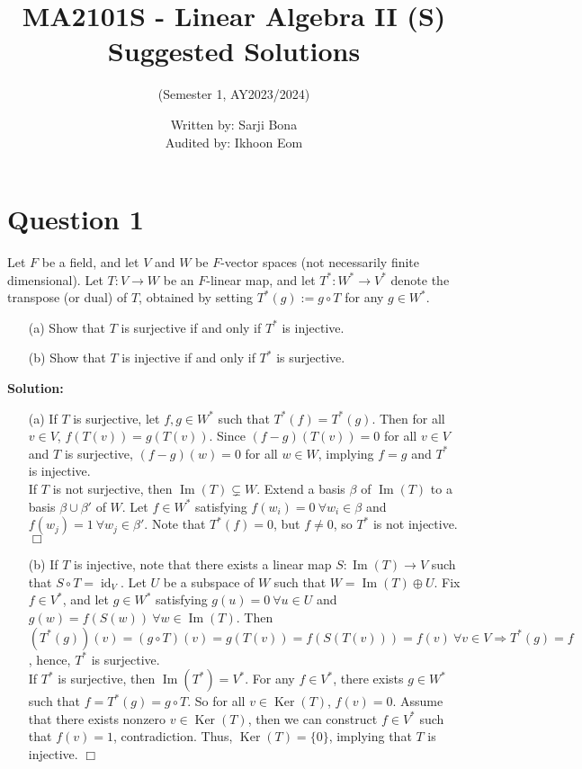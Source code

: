 \documentclass[12pt]{article}
\title{MA2101S - Linear Algebra II (S) Suggested Solutions}
\author{(Semester 1, AY2023/2024)}
\date{Written by: Sarji Bona\\Audited by: Ikhoon Eom}
\DeclareMathOperator{\id}{id}
\DeclareMathOperator{\im}{Im}
\DeclareMathOperator{\Ker}{Ker}
\begin{document}
\maketitle

\section*{Question 1}
Let $F$ be a field, and let $V$ and $W$ be $F$-vector spaces (not necessarily finite dimensional). Let $T : V \to W$ be an $F$-linear map, and let $T^* : W^* \to V^*$ denote the transpose (or dual) of $T$, obtained by setting $T^*(g) := g \circ T$ for any $g \in W^*$. 
\begin{enumerate}
    \item[(a)] Show that $T$ is surjective if and only if $T^*$ is injective.
    \item[(b)] Show that $T$ is injective if and only if $T^*$ is surjective.
\end{enumerate}
\textbf{Solution:} 
\begin{enumerate}
    \item[(a)] If $T$ is surjective, let $f, g \in W^*$ such that $T^*(f) = T^*(g)$. Then for all $v \in V$, $f(T(v)) = g(T(v))$. Since $(f - g)(T(v)) = 0$ for all $v \in V$ and $T$ is surjective, $(f - g)(w) = 0$ for all $w \in W$, implying $f = g$ and $T^*$ is injective. \\

    If $T$ is not surjective, then $\im(T) \subsetneq W$. Extend a basis $\beta$ of $\im(T)$ to a basis $\beta \cup \beta'$ of $W$. Let $f \in W^*$ satisfying $f(w_i) = 0 \ \forall w_i \in \beta$ and $f(w_j) = 1 \ \forall w_j \in \beta'$. Note that $T^*(f) = 0$, but $f \ne 0$, so $T^*$ is not injective. \hfill  $\Box$
    \item[(b)] If $T$ is injective, note that there exists a linear map $S : \im(T) \to V$ such that $S \circ T = \id_V$. Let $U$ be a subspace of $W$ such that $W = \im(T) \oplus U$. Fix $f \in V^*$, and let $g \in W^*$ satisfying $g(u) = 0 \ \forall u \in U$ and $g(w) = f(S(w)) \ \forall w \in \im(T)$. Then $(T^*(g))(v) = (g \circ T)(v) = g(T(v)) = f(S(T(v))) = f(v) \ \forall v \in V \Rightarrow T^*(g) = f$, hence, $T^*$ is surjective. \\

    If $T^*$ is surjective, then $\im(T^*) = V^*$. For any $f \in V^*$, there exists $g \in W^*$ such that $f = T^*(g) = g \circ T$. So for all $v \in \Ker(T)$, $f(v) = 0$. Assume that there exists nonzero $v \in \Ker(T)$, then we can construct $f \in V^*$ such that $f(v) = 1$,  contradiction. Thus, $\Ker(T) = \{0\}$, implying that $T$ is injective. \hfill $\Box$
    \end{enumerate}
    
\end{document}
